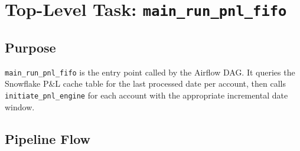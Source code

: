 \documentclass[11pt, a4paper]{article}
\begin{document}
\section{Top-Level Task: \texttt{main\_run\_pnl\_fifo}}

\subsection{Purpose}

\texttt{main\_run\_pnl\_fifo} is the entry point called by the
Airflow DAG.  It queries the Snowflake P\&L cache table for the
last processed date per account, then calls
\texttt{initiate\_pnl\_engine} for each account with the
appropriate incremental date window.

\subsection{Pipeline Flow}
\end{document}
